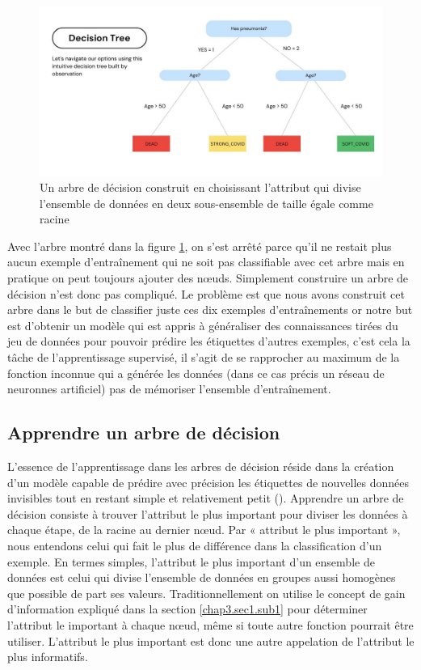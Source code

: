 \begin{figure}
    \centering
    \includegraphics[width=0.75\linewidth]{images/DecisionTree1.jpg}
    \caption{Un arbre de décision construit en choisissant l'attribut qui divise l'ensemble de données en deux sous-ensemble de taille égale comme racine}
    \label{fig:fig3}
\end{figure}

Avec l'arbre montré dans la figure \ref{fig:fig3}, on s'est arrêté parce qu'il ne restait plus aucun exemple d'entraînement qui ne soit pas classifiable avec cet arbre mais en pratique on peut toujours ajouter des nœuds. Simplement construire un arbre de décision n'est donc pas compliqué. Le problème est que nous avons construit cet arbre dans le but de classifier juste ces dix exemples d'entraînements or notre but est d'obtenir un modèle qui est appris à généraliser des connaissances tirées du jeu de données pour pouvoir prédire les étiquettes d'autres exemples, c'est cela la tâche de l'apprentissage supervisé, il s'agit de se rapprocher au maximum de la fonction inconnue qui a générée les données (dans ce cas précis un réseau de neuronnes artificiel) pas de mémoriser l'ensemble d'entraînement.

\subsection{Apprendre un arbre de décision}
\label{chap4.sec2.sub2}
L’essence de l’apprentissage dans les arbres de décision réside dans la création d’un modèle capable de prédire avec précision les étiquettes de nouvelles données invisibles tout en restant simple et relativement petit (\cite{RussellNorvig2020}). Apprendre un arbre de décision consiste à trouver l'attribut le plus important pour diviser les données à chaque étape, de la racine au dernier nœud. Par « attribut le plus important », nous entendons celui qui fait le plus de différence dans la classification d’un exemple. En termes simples, l'attribut le plus important d'un ensemble de données est celui qui divise l'ensemble de données en groupes aussi homogènes que possible de part ses valeurs. Traditionnellement on utilise le concept de gain d'information expliqué dans la section \ref{chap3.sec1.sub1} pour déterminer l'attribut le important à chaque nœud, même si toute autre fonction pourrait être utiliser. L'attribut le plus important est donc une autre appelation de l'attribut le plus informatifs.

